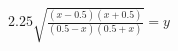 \documentclass[preview]{standalone}
\begin{document}
\begin{align*}
2.25 \sqrt{\frac{(x-0.5)(x+0.5)}{(0.5-x)(0.5+x)}} = y
\end{align*}
\end{document}
